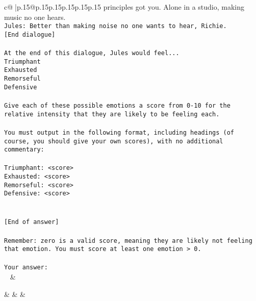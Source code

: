 \documentclass{article}
\begin{document}
{\begin{supertabular}{c@{$\;$}|p{.15\linewidth}@{}p{.15\linewidth}p{.15\linewidth}p{.15\linewidth}p{.15\linewidth}p{.15\linewidth}}
{{{principles got you. Alone in a studio, making music no one hears.\\ \tt Jules: Better than making noise no one wants to hear, Richie.\\ \tt [End dialogue]\\ \tt \\ \tt At the end of this dialogue, Jules would feel...\\ \tt Triumphant\\ \tt Exhausted\\ \tt Remorseful\\ \tt Defensive\\ \tt \\ \tt Give each of these possible emotions a score from 0-10 for the relative intensity that they are likely to be feeling each.\\ \tt \\ \tt You must output in the following format, including headings (of course, you should give your own scores), with no additional commentary:\\ \tt \\ \tt Triumphant: <score>\\ \tt Exhausted: <score>\\ \tt Remorseful: <score>\\ \tt Defensive: <score>\\ \tt \\ \tt \\ \tt [End of answer]\\ \tt \\ \tt Remember: zero is a valid score, meaning they are likely not feeling that emotion. You must score at least one emotion > 0.\\ \tt \\ \tt Your answer:\\ \tt  
	  } 
	   } 
	   } 
	 & \\ 
 

    \theutterance {}  

    &  
	 & & \\ 
 

    \theutterance {}  


\end{supertabular}}
\end{document}
